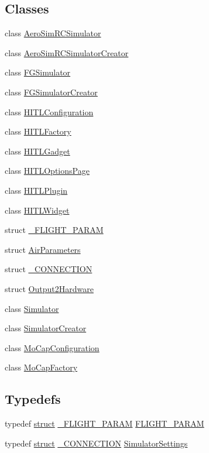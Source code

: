 \subsection*{Classes}
\begin{DoxyCompactItemize}
\item 
class \hyperlink{class_aero_sim_r_c_simulator}{Aero\-Sim\-R\-C\-Simulator}
\item 
class \hyperlink{class_aero_sim_r_c_simulator_creator}{Aero\-Sim\-R\-C\-Simulator\-Creator}
\item 
class \hyperlink{class_f_g_simulator}{F\-G\-Simulator}
\item 
class \hyperlink{class_f_g_simulator_creator}{F\-G\-Simulator\-Creator}
\item 
class \hyperlink{class_h_i_t_l_configuration}{H\-I\-T\-L\-Configuration}
\item 
class \hyperlink{class_h_i_t_l_factory}{H\-I\-T\-L\-Factory}
\item 
class \hyperlink{class_h_i_t_l_gadget}{H\-I\-T\-L\-Gadget}
\item 
class \hyperlink{class_h_i_t_l_options_page}{H\-I\-T\-L\-Options\-Page}
\item 
class \hyperlink{class_h_i_t_l_plugin}{H\-I\-T\-L\-Plugin}
\item 
class \hyperlink{class_h_i_t_l_widget}{H\-I\-T\-L\-Widget}
\item 
struct \hyperlink{struct___f_l_i_g_h_t___p_a_r_a_m}{\-\_\-\-F\-L\-I\-G\-H\-T\-\_\-\-P\-A\-R\-A\-M}
\item 
struct \hyperlink{struct_air_parameters}{Air\-Parameters}
\item 
struct \hyperlink{struct___c_o_n_n_e_c_t_i_o_n}{\-\_\-\-C\-O\-N\-N\-E\-C\-T\-I\-O\-N}
\item 
struct \hyperlink{struct_output2_hardware}{Output2\-Hardware}
\item 
class \hyperlink{class_simulator}{Simulator}
\item 
class \hyperlink{class_simulator_creator}{Simulator\-Creator}
\item 
class \hyperlink{class_mo_cap_configuration}{Mo\-Cap\-Configuration}
\item 
class \hyperlink{class_mo_cap_factory}{Mo\-Cap\-Factory}
\end{DoxyCompactItemize}
\subsection*{Typedefs}
\begin{DoxyCompactItemize}
\item 
typedef \hyperlink{sdlgamepad_8dox_aba655c5729da86df745f0c8e7f9ba8d2}{struct} \hyperlink{struct___f_l_i_g_h_t___p_a_r_a_m}{\-\_\-\-F\-L\-I\-G\-H\-T\-\_\-\-P\-A\-R\-A\-M} \hyperlink{group___h_i_t_l_plugin_ga7bda7a22b899fe8dff0ba9a0cae99da6}{F\-L\-I\-G\-H\-T\-\_\-\-P\-A\-R\-A\-M}
\item 
typedef \hyperlink{sdlgamepad_8dox_aba655c5729da86df745f0c8e7f9ba8d2}{struct} \hyperlink{struct___c_o_n_n_e_c_t_i_o_n}{\-\_\-\-C\-O\-N\-N\-E\-C\-T\-I\-O\-N} \hyperlink{group___h_i_t_l_plugin_ga052199f1328d3002bce3e45345aa7f4e}{Simulator\-Settings}
\end{DoxyCompactItemize}
